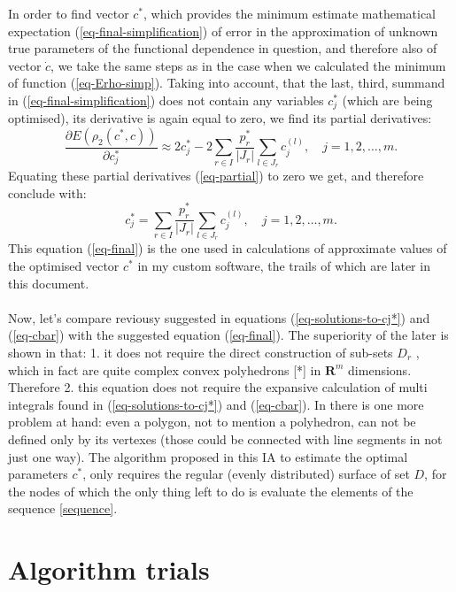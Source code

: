 \documentclass[11pt,a4paper]{article}
\numberwithin{equation}{subsection}
\begin{document}
In order to find vector $c^{*}$, which provides the minimum estimate mathematical expectation (\ref{eq-final-simplification}) of error in the approximation of unknown true parameters of the functional dependence in question, and therefore also of vector $\dot{c}$, we take the same steps as in the case when we calculated the minimum of function (\ref{eq-Erho-simp}). Taking into account, that the last, third, summand in (\ref{eq-final-simplification}) does not contain 
any variables $c_{j}^{*}$ (which are being optimised), its derivative is again equal to zero, we find its partial derivatives:
\begin{equation}
\frac{\partial E (\rho_{2}(c^{*},c))}{\partial c_{j}^{*}} \approx 2c_{j}^{*} - 2 \sum\limits_{r \in I} \frac{p_{r}^{*}}{\left| J_{r} \right|} \sum\limits_{l \in J_{r}} c_{j}^{(l)}, \quad j=1,2,\dots,m. \label{eq-partial}
\end{equation}
Equating these partial derivatives (\ref{eq-partial}) to zero we get, and therefore conclude with:
\begin{equation}
c_{j}^{*} = \sum\limits_{r \in I} \frac{p_{r}^{*}}{\left| J_{r} \right|} \sum\limits_{l \in J_{r}} c_{j}^{(l)}, \quad j=1,2,\dots,m. \label{eq-final}
\end{equation}
This equation (\ref{eq-final}) is the one used in calculations of approximate values of the optimised vector $c^{*}$ in my custom software, the trails of which are later in this document.\\
\\
Now, let's compare reviousy suggested in \cite{balk2010regression} equations (\ref{eq-solutions-to-cj*}) and (\ref{eq-cbar}) with the suggested equation (\ref{eq-final}). The superiority of the later is shown in that: 1. it does not require the direct construction of sub-sets $D_{r}$
, which in fact are quite complex convex polyhedrons [*] in $\boldsymbol{R}^{m}$ dimensions. Therefore 2. this equation does not require the expansive calculation of multi integrals found in (\ref{eq-solutions-to-cj*}) and (\ref{eq-cbar}).  In \cite{balk2010regression} there is one more problem at hand: even a polygon, not to mention a polyhedron, can not be defined only by its vertexes (those could be connected with line segments in not just one way). The algorithm proposed in this IA to estimate the optimal parameters $c^{*}$, only requires the regular (evenly distributed) surface of set $D$, for the nodes of which the only thing left to do is evaluate the elements of the sequence  \ref{sequence}.
\section{Algorithm trials}
\end{document}
